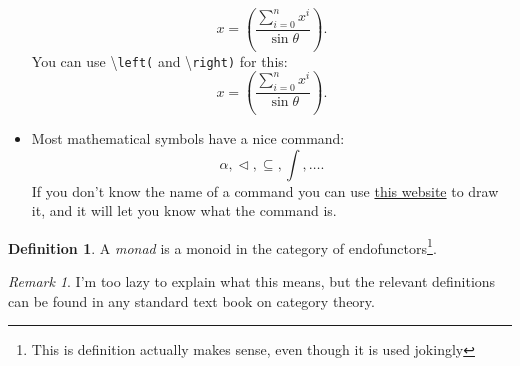 \documentclass{article}
\theoremstyle{plain}
\theoremstyle{definition}
\newtheorem{definition}[theorem]{Definition}
\theoremstyle{remark}
\newtheorem{remark}[theorem]{Remark}
\begin{document}
\begin{itemize}
\begin{equation*}
		      x= (\frac{\sum_{i=0}^n x^i}{\sin \theta}).
	      \end{equation*}
	      You can use \textbackslash \texttt{left(} and \textbackslash \texttt{right)} for this:
	      \begin{equation*}
		      x= \left(\frac{\sum_{i=0}^n x^i}{\sin \theta}\right).
	      \end{equation*}
	\item Most mathematical symbols have a nice command:
	      \begin{equation*}
		      \alpha, \vartriangleleft, \subseteq, \int, \dots.
	      \end{equation*}
	      If you don't know the name of a command you can use \href{http://detexify.kirelabs.org/classify.html}{this website} to draw it, and it will let you know what the command is.
\end{itemize}

\begin{definition}
	A \emph{monad} is a monoid in the category of endofunctors\footnote{This is definition actually makes sense, even though it is used jokingly}.
\end{definition}
\begin{remark}
	I'm too lazy to explain what this means, but the relevant definitions can be found in any standard text book on category theory.
\end{remark}



\end{document}

